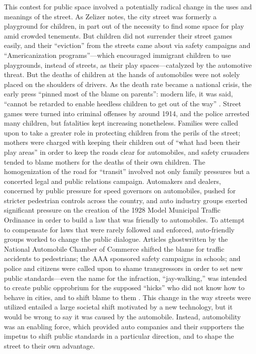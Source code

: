 This contest for public space involved a potentially radical change in
the uses and meanings of the street. As Zelizer notes, the city street
was formerly a playground for children, in part out of the necessity
to find some space for play amid crowded tenements\cite[p.
  33]{???-zelizer}. But children did not surrender their street games
easily, and their ``eviction'' from the streets came about via safety
campaigns and ``Americanization programs''---which encouraged
immigrant children to use playgrounds, instead of streets, as their
play spaces---catalyzed by the automotive threat\cite[p.
  35]{???-zelizer}. But the deaths of children at the hands of
automobiles were not solely placed on the shoulders of drivers. As the
death rate became a national crisis, the
early press ``pinned most of the blame on parents'': modern life, it
was said, ``cannot be retarded to enable heedless children to get out
of the way'' \cite[p. 37]{???-zelizer}. Street games were turned into
criminal offenses by around 1914, and the police arrested many
children, but fatalities kept increasing nonetheless\cite[p.
  38]{???-zelizer}. Families were called upon to take a greater role
in protecting children from the perils of the street; mothers were
charged with keeping their children out of ``what had been their play
areas'' in order to keep the roads clear for automobiles, and safety
crusaders tended to blame mothers for the deaths of their own
children\cite[p. 13]{???-lochlannjain}. The homogenization of the road
for ``transit'' \cite[p. 13]{???_lochlannjain} involved not only
family pressures but a concerted legal and public relations campaign. Automakers
and dealers, concerned by public pressure for speed governors on
automobiles, pushed for stricter pedestrian controls across the country, and
auto industry groups exerted significant pressure on the creation of
the 1928 Model Municipal Traffic Ordinance in order to build a law
that was friendly to automobiles\cite{???-vox}. To attempt to
compensate for laws that were rarely followed and enforced,
auto-friendly groups worked to change the public dialogue. Articles
ghostwritten by the National Automobile Chamber of Commerce shifted
the blame for traffic accidents to pedestrians; the AAA sponsored
safety campaigns in schools; and police and citizens were called upon
to shame transgressors in order to set new public standards---even the
name for the infraction, ``jay-walking,'' was intended to create
public opprobrium for the supposed ``hicks'' who did not know how to
behave in cities, and to shift blame to them \cite{???-vox}. This
change in the way streets were utilized entailed a large societal
shift motivated by a new technology, but it would be wrong to say it
was caused by the automobile. Instead, automobility was an enabling
force, which provided auto companies and their supporters the impetus
to shift public standards in a particular direction, and to shape the
street to their own advantage.

